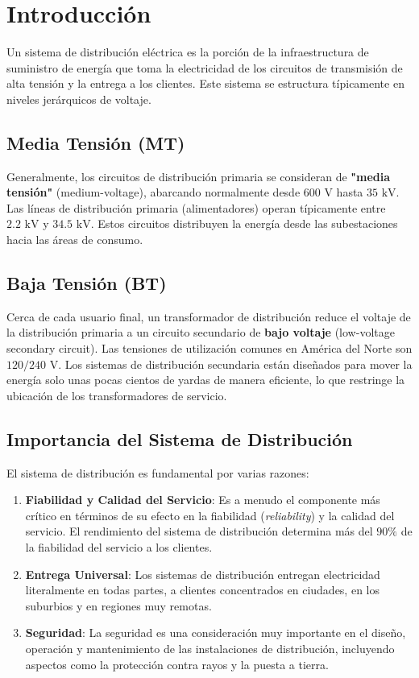 
\section*{Introducción}


Un sistema de distribución eléctrica es la porción de la infraestructura de suministro de energía que toma la electricidad de los circuitos de transmisión de alta tensión y la entrega a los clientes. Este sistema se estructura típicamente en niveles jerárquicos de voltaje.

\subsection*{Media Tensión (MT)}
Generalmente, los circuitos de distribución primaria se consideran de \textbf{"media tensión"} (medium-voltage), abarcando normalmente desde $600 \text{ V}$ hasta $35 \text{ kV}$. Las líneas de distribución primaria (alimentadores) operan típicamente entre $2.2 \text{ kV}$ y $34.5 \text{ kV}$. Estos circuitos distribuyen la energía desde las subestaciones hacia las áreas de consumo.

\subsection*{Baja Tensión (BT)}
Cerca de cada usuario final, un transformador de distribución reduce el voltaje de la distribución primaria a un circuito secundario de \textbf{bajo voltaje} (low-voltage secondary circuit). Las tensiones de utilización comunes en América del Norte son $120/240 \text{ V}$. Los sistemas de distribución secundaria están diseñados para mover la energía solo unas pocas cientos de yardas de manera eficiente, lo que restringe la ubicación de los transformadores de servicio.

\subsection*{Importancia del Sistema de Distribución}
El sistema de distribución es fundamental por varias razones:
\begin{enumerate}
    \item \textbf{Fiabilidad y Calidad del Servicio}: Es a menudo el componente más crítico en términos de su efecto en la fiabilidad (\textit{reliability}) y la calidad del servicio. El rendimiento del sistema de distribución determina más del $90\%$ de la fiabilidad del servicio a los clientes.
    \item \textbf{Entrega Universal}: Los sistemas de distribución entregan electricidad literalmente en todas partes, a clientes concentrados en ciudades, en los suburbios y en regiones muy remotas.
    \item \textbf{Seguridad}: La seguridad es una consideración muy importante en el diseño, operación y mantenimiento de las instalaciones de distribución, incluyendo aspectos como la protección contra rayos y la puesta a tierra.
\end{enumerate}


